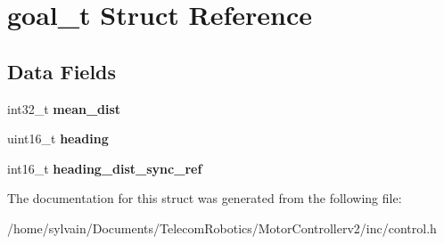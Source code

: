 \hypertarget{structgoal__t}{}\section{goal\+\_\+t Struct Reference}
\label{structgoal__t}
\subsection*{Data Fields}
\begin{DoxyCompactItemize}
\item 
\hypertarget{structgoal__t_a511d33aacd243752643d9788407e3b6c}{}\label{structgoal__t_a511d33aacd243752643d9788407e3b6c} 
int32\+\_\+t {\bfseries mean\+\_\+dist}
\item 
\hypertarget{structgoal__t_ac65299224b7369d5ceb457a3aee61faf}{}\label{structgoal__t_ac65299224b7369d5ceb457a3aee61faf} 
uint16\+\_\+t {\bfseries heading}
\item 
\hypertarget{structgoal__t_a17c8fd38d7fe46dcf0515665c3b8a0a2}{}\label{structgoal__t_a17c8fd38d7fe46dcf0515665c3b8a0a2} 
int16\+\_\+t {\bfseries heading\+\_\+dist\+\_\+sync\+\_\+ref}
\end{DoxyCompactItemize}


The documentation for this struct was generated from the following file\+:\begin{DoxyCompactItemize}
\item 
/home/sylvain/\+Documents/\+Telecom\+Robotics/\+Motor\+Controllerv2/inc/control.\+h\end{DoxyCompactItemize}
